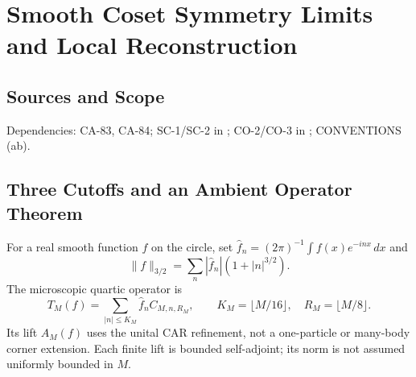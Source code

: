 
\section{Smooth Coset Symmetry Limits and Local Reconstruction}
\label{sec:smeared-coset-and-locality}

\subsection{Sources and Scope}

Dependencies: CA-83, CA-84; SC-1/SC-2 in
; CO-2/CO-3 in
; CONVENTIONS (ab).


\subsection{Three Cutoffs and an Ambient Operator Theorem}

For a real smooth function $f$ on the circle, set
$\widehat f_n=(2\pi)^{-1}\int f(x)e^{-inx}\,dx$ and
\[
 \|f\|_{3/2}=\sum_n|\widehat f_n|(1+|n|^{3/2}).
\]
The microscopic quartic operator is
\[
 T_M(f)=\sum_{|n|\le K_M}\widehat f_n C_{M,n,R_M},\qquad
 K_M=\lfloor M/16\rfloor,\quad R_M=\lfloor M/8\rfloor.
\]
Its lift $A_M(f)$ uses the unital CAR refinement, not a one-particle or
many-body corner extension. Each finite lift is bounded self-adjoint;
its norm is not assumed uniformly bounded in $M$.

